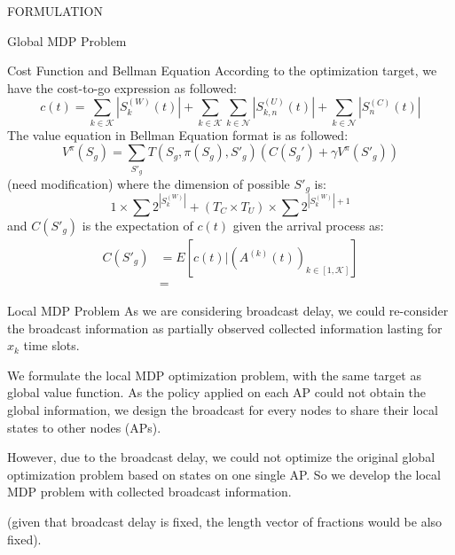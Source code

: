 \documentclass[10pt, conference, letterpaper]{IEEEtran}
\begin{document}
\begin{section}{FORMULATION}
\begin{subsection}{Global MDP Problem}
            \begin{subsubsection}{Cost Function and Bellman Equation}
                According to the optimization target, we have the cost-to-go expression as followed:
                $$
                c(t) = \sum_{k \in \mathcal{K}}{|S^{(W)}_{k}(t)|}
                        + \sum_{k \in \mathcal{K}}\sum_{k \in \mathcal{N}}{|S^{(U)}_{k,n}(t)|}
                        + \sum_{k \in \mathcal{N}}{|S^{(C)}_{n}(t)|}
                $$
                The value equation in Bellman Equation format is as followed:
                $$
                V^{\pi}(S_g) = \sum_{S'_g} T(S_g, \pi(S_g), S'_g) (C(S_g') + \gamma V^{\pi}(S'_g))
                $$
                (need modification) where the dimension of possible $S'_g$ is:
                $$
                1 \times \sum{2^{|S^{(W)}_k|}} + (T_C \times T_U) \times \sum{2^{|S^{(W)}_k|+1}}
                $$
                and $C(S'_g)$ is the expectation of $c(t)$ given the arrival process as:
                \begin{align*}
                    C(S'_g) &= E[c(t)|(A^{(k)}(t))_{k \in [1,\mathcal{K}]}]
                    \\
                    &= 
                \end{align*}
            \end{subsubsection}
        \end{subsection}

        \begin{subsection}{Local MDP Problem}
            As we are considering broadcast delay, we could re-consider the broadcast information as partially observed collected information lasting for $\hat{x}_k$ time slots.

            We formulate the local MDP optimization problem, with the same target as global value function. As the policy applied on each AP could not obtain the global information, we design the broadcast for every nodes to share their local states to other nodes (APs).
            
            However, due to the broadcast delay, we could not optimize the original global optimization problem based on states on one single AP. So we develop the local MDP problem with collected broadcast information.

            (given that broadcast delay is fixed, the length vector of fractions would be also fixed).


\end{subsection}
\end{section}
\end{document}

